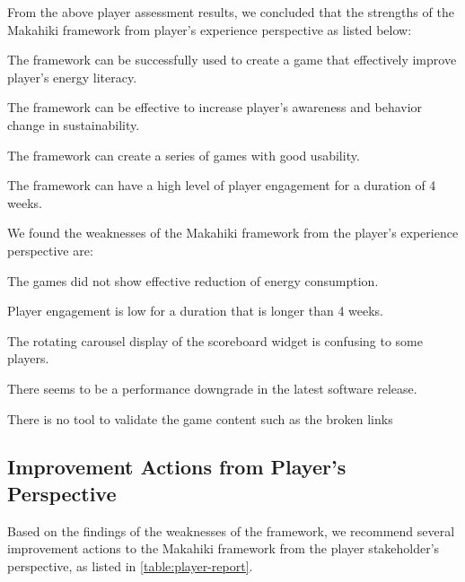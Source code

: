 From the above player assessment results, we concluded that the strengths of the Makahiki framework from player's experience perspective as listed below:   

\begin{compactenum}
    \item The framework can be successfully used to create a game that effectively improve player's energy literacy.
    \item The framework can be effective to increase player's awareness and behavior change in sustainability.
    \item The framework can create a series of games with good usability.
    \item The framework can have a high level of player engagement for a duration of 4 weeks.
\end{compactenum}               

We found the weaknesses of the Makahiki framework from the player's experience perspective are:
\begin{compactenum}
     \item The games did not show effective reduction of energy consumption.
     \item Player engagement is low for a duration that is longer than 4 weeks. 
     \item The rotating carousel display of the scoreboard widget is confusing to some players.
     \item There seems to be a performance downgrade in the latest software release.
     \item There is no tool to validate the game content such as the broken links
\end{compactenum}  

\subsection{Improvement Actions from Player's Perspective}

Based on the findings of the weaknesses of the framework, we recommend several improvement actions to the Makahiki framework from the player stakeholder's perspective, as listed in \autoref{table:player-report}.

